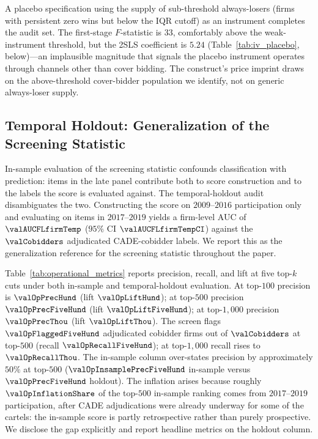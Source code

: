 A placebo specification using the supply of sub-threshold
always-losers (firms with persistent zero wins but below the IQR
cutoff) as an instrument completes the audit set. The first-stage
$F$-statistic is $33$, comfortably above the
\citet{stock2005testing} weak-instrument threshold, but the 2SLS
coefficient is $5.24$ (Table~\ref{tab:iv_placebo}, below)---an implausible
magnitude that signals the placebo instrument operates through
channels other than cover bidding. The construct's price imprint
draws on the above-threshold cover-bidder population we identify,
not on generic always-loser supply.



\subsection{Temporal Holdout: Generalization of the Screening
Statistic}
\label{sec:rob_operational}

In-sample evaluation of the screening statistic confounds
classification with prediction: items in the late panel
contribute both to score construction and to the labels the
score is evaluated against. The temporal-holdout audit
disambiguates the two. Constructing the score on
$2009$--$2016$ participation only and evaluating on items in
$2017$--$2019$ yields a firm-level AUC of $\valAUCFLfirmTemp$
($95\%$ CI $\valAUCFLfirmTempCI$) against the $\valCobidders$
adjudicated CADE-cobidder labels. We report this as the
generalization reference for the screening statistic throughout
the paper.

Table~\ref{tab:operational_metrics} reports precision, recall,
and lift at five top-$k$ cuts under both in-sample and
temporal-holdout evaluation. At top-$100$ precision is
$\valOpPrecHund$ (lift $\valOpLiftHund$); at top-$500$
precision $\valOpPrecFiveHund$ (lift $\valOpLiftFiveHund$); at
top-$1{,}000$ precision $\valOpPrecThou$ (lift $\valOpLiftThou$).
The screen flags $\valOpFlaggedFiveHund$ adjudicated cobidder
firms out of $\valCobidders$ at top-$500$ (recall
$\valOpRecallFiveHund$); at top-$1{,}000$ recall rises to
$\valOpRecallThou$. The in-sample column over-states precision
by approximately $50\%$ at top-$500$
($\valOpInsamplePrecFiveHund$ in-sample versus
$\valOpPrecFiveHund$ holdout). The inflation arises because
roughly $\valOpInflationShare$ of the top-$500$ in-sample
ranking comes
from $2017$--$2019$ participation, after CADE adjudications were
already underway for some of the cartels: the in-sample score is
partly retrospective rather than purely prospective. We disclose
the gap explicitly and report headline metrics on the holdout
column.

